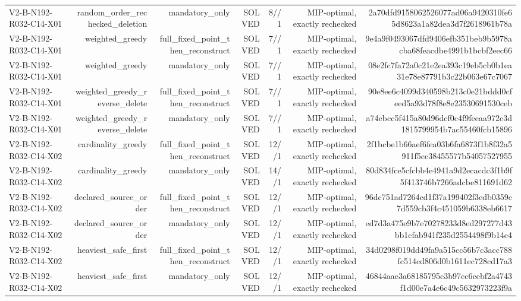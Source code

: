 {\begin{longtable}{lrrrrrr}
V2-B-N192-R032-C14-X01 & random\_order\_rechecked\_deletion & mandatory\_only & SOLVED & 8//1 & MIP-optimal, exactly rechecked & 2a70dfd9158062526077ad06a9420310fe65d8623a1a82dea3d7f2618961b78a \\
V2-B-N192-R032-C14-X01 & weighted\_greedy & full\_fixed\_point\_then\_reconstruct & SOLVED & 7//1 & MIP-optimal, exactly rechecked & 9e4a9f0493067dfd9406efb351beb9b5978acba68feacdbe4991b1bcbf2eec66 \\
V2-B-N192-R032-C14-X01 & weighted\_greedy & mandatory\_only & SOLVED & 7//1 & MIP-optimal, exactly rechecked & 08e2fc7fa72a0c21e2ea393c19eb5cb0b1ea31e78e87791b3c22b063e67c7067 \\
V2-B-N192-R032-C14-X01 & weighted\_greedy\_reverse\_delete & full\_fixed\_point\_then\_reconstruct & SOLVED & 7//1 & MIP-optimal, exactly rechecked & 90e8ee6c4099d340598b213c0e21bddd0cfeed5a93d78f8e8e23530691530ceb \\
V2-B-N192-R032-C14-X01 & weighted\_greedy\_reverse\_delete & mandatory\_only & SOLVED & 7//1 & MIP-optimal, exactly rechecked & a74ebcc5f415a80d96dcf0c4f9feeaa972c3d1815799954b7ac55460fcb15896 \\
V2-B-N192-R032-C14-X02 & cardinality\_greedy & full\_fixed\_point\_then\_reconstruct & SOLVED & 12//1 & MIP-optimal, exactly rechecked & 2f1bcbe1b66aef6fea03b6fa6873f1b8f32a5911f5cc38455577b54057527955 \\
V2-B-N192-R032-C14-X02 & cardinality\_greedy & mandatory\_only & SOLVED & 14//1 & MIP-optimal, exactly rechecked & 80d834fce5cfcbb4e4941a9d2ecacdc3f1b9f5f413746b7266adcbe811691d62 \\
V2-B-N192-R032-C14-X02 & declared\_source\_order & full\_fixed\_point\_then\_reconstruct & SOLVED & 12//1 & MIP-optimal, exactly rechecked & 96dc751ad7264cd1f37a199402f3edb0359c7d559cb3f4c451059b6338eb6617 \\
V2-B-N192-R032-C14-X02 & declared\_source\_order & mandatory\_only & SOLVED & 12//1 & MIP-optimal, exactly rechecked & ed7d3a475e9b7e70278233d8ed297277d43bb1cfab941f235d2554498f9b14e4 \\
V2-B-N192-R032-C14-X02 & heaviest\_safe\_first & full\_fixed\_point\_then\_reconstruct & SOLVED & 12//1 & MIP-optimal, exactly rechecked & 34d0298f019dd49fa9a515cc56b7c3acc788fc514cd806d0b1611ec728cd17a3 \\
V2-B-N192-R032-C14-X02 & heaviest\_safe\_first & mandatory\_only & SOLVED & 12//1 & MIP-optimal, exactly rechecked & 46844aae3a68185795c3b97cc6cebf2a4743f1d00e7a4e6c49c5632973223f9a \\

\end{longtable}}
